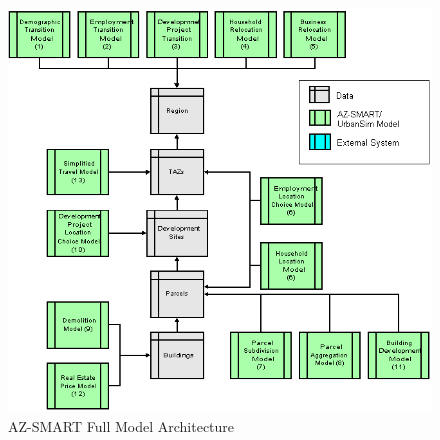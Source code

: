 \begin{figure}[h]
\begin{center}
\includegraphics[scale=0.8]{figures/flow.png}
\caption{AZ-SMART Full Model Architecture} \label{figFlow}
\end{center}
\end{figure}

